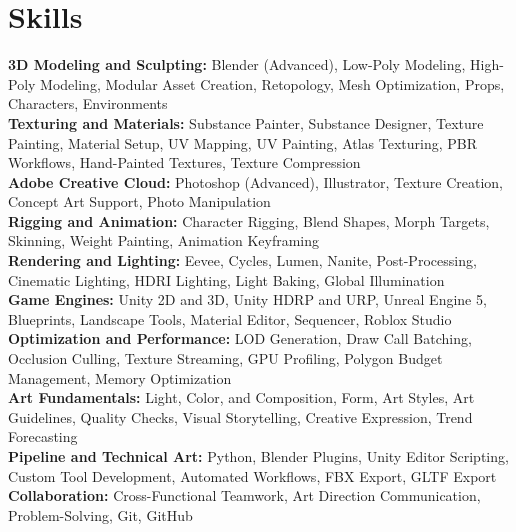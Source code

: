 \documentclass[letterpaper,11pt]{article}
\begin{document}
\section{Skills}
 \begin{itemize}[leftmargin=0.15in, label={}]
    \small{\item{
     \textbf{3D Modeling and Sculpting:}{ Blender (Advanced), Low-Poly Modeling, High-Poly Modeling, Modular Asset Creation, Retopology, Mesh Optimization, Props, Characters, Environments} \\
     \textbf{Texturing and Materials:}{ Substance Painter, Substance Designer, Texture Painting, Material Setup, UV Mapping, UV Painting, Atlas Texturing, PBR Workflows, Hand-Painted Textures, Texture Compression} \\
     \textbf{Adobe Creative Cloud:}{ Photoshop (Advanced), Illustrator, Texture Creation, Concept Art Support, Photo Manipulation} \\
     \textbf{Rigging and Animation:}{ Character Rigging, Blend Shapes, Morph Targets, Skinning, Weight Painting, Animation Keyframing} \\
     \textbf{Rendering and Lighting:}{ Eevee, Cycles, Lumen, Nanite, Post-Processing, Cinematic Lighting, HDRI Lighting, Light Baking, Global Illumination} \\
     \textbf{Game Engines:}{ Unity 2D and 3D, Unity HDRP and URP, Unreal Engine 5, Blueprints, Landscape Tools, Material Editor, Sequencer, Roblox Studio} \\
     \textbf{Optimization and Performance:}{ LOD Generation, Draw Call Batching, Occlusion Culling, Texture Streaming, GPU Profiling, Polygon Budget Management, Memory Optimization} \\
     \textbf{Art Fundamentals:}{ Light, Color, and Composition, Form, Art Styles, Art Guidelines, Quality Checks, Visual Storytelling, Creative Expression, Trend Forecasting} \\
     \textbf{Pipeline and Technical Art:}{ Python, Blender Plugins, Unity Editor Scripting, Custom Tool Development, Automated Workflows, FBX Export, GLTF Export} \\
     \textbf{Collaboration:}{ Cross-Functional Teamwork, Art Direction Communication, Problem-Solving, Git, GitHub}
    }}
 \end{itemize}

\end{document}
